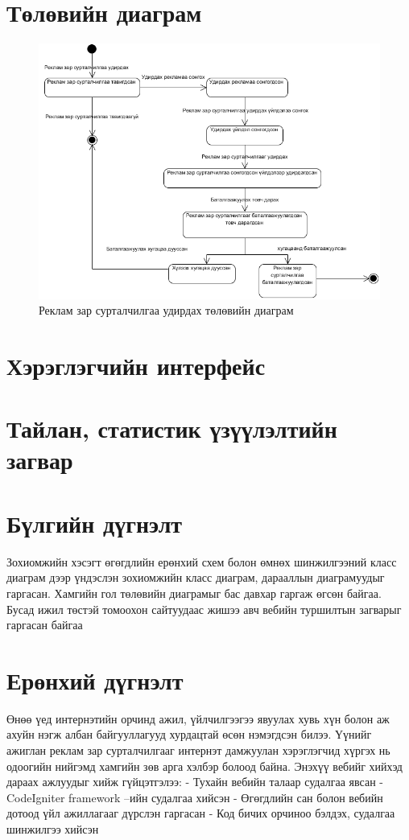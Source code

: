 \section{Төлөвийн диаграм }
	\begin{figure}[!h]

		\includegraphics[scale=0.55]{Diagrams/state}
		\caption[Реклам зар сурталчилгаа удирдах төлөвийн диаграм]{Реклам зар сурталчилгаа удирдах төлөвийн диаграм}
		\label{text}
	\end{figure}

\section{Хэрэглэгчийн интерфейс }
	
\section{Тайлан, статистик үзүүлэлтийн загвар }
	
\section{Бүлгийн дүгнэлт}
	Зохиомжийн хэсэгт өгөгдлийн ерөнхий схем болон өмнөх шинжилгээний класс диаграм дээр үндэслэн зохиомжийн класс диаграм, дарааллын диаграмуудыг гаргасан. Хамгийн гол төлөвийн диаграмыг бас давхар гаргаж өгсөн байгаа. Бусад ижил төстэй томоохон сайтуудаас жишээ авч вебийн туршилтын загварыг гаргасан байгаа
\section{Ерөнхий дүгнэлт}
	Өнөө үед интернэтийн орчинд ажил, үйлчилгээгээ явуулах хувь хүн болон аж ахуйн нэгж албан байгууллагууд хурдацтай өсөн нэмэгдсэн билээ. Үүнийг ажиглан реклам зар сурталчилгааг интернэт дамжуулан хэрэглэгчид хүргэх нь одоогийн нийгэмд хамгийн зөв арга хэлбэр болоод байна. Энэхүү вебийг хийхэд дараах ажлуудыг хийж гүйцэтгэлээ:
	-	Тухайн вебийн талаар судалгаа явсан
	-	CodeIgniter framework –ийн судалгаа хийсэн
	-	Өгөгдлийн сан болон вебийн дотоод үйл ажиллагааг дүрслэн гаргасан
	-	Код бичих орчиноо бэлдэх, судалгаа шинжилгээ хийсэн
	
